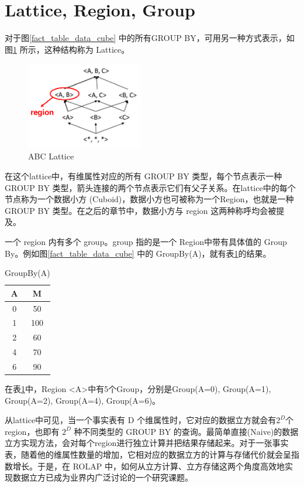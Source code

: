 \section{Lattice, Region, Group}

对于图\ref{fact_table_data_cube} 中的所有GROUP BY，可用另一种方式表示，如图\ref{abc_lattice} 所示，这种结构称为 Lattice。

\begin{figure}[!htb]
\centering\includegraphics[width=2in]{picture/ch_preliminary/abc_lattice} 
\caption{ABC Lattice}\label{abc_lattice} 
\end{figure} 

在这个lattice中，有维属性对应的所有 GROUP BY 类型，每个节点表示一种 GROUP BY 类型，箭头连接的两个节点表示它们有父子关系。在lattice中的每个节点称为一个数据小方 (Cuboid)，数据小方也可被称为一个Region，也就是一种 GROUP BY 类型。在之后的章节中，数据小方与 region 这两种称呼均会被提及。

一个 region 内有多个 group。group 指的是一个
Region中带有具体值的 Group By。例如图\ref{fact_table_data_cube} 中的 GroupBy(A)，就有表\ref{groupby_a_table}的结果。

\begin{table}[hbtp]
\begin{center}
\begin{tabular}{|c|c|}
\hline 
A & M \\ 
\hline 
0 & 50 \\ 
\hline 
1 & 100 \\ 
\hline 
2 & 60 \\ 
\hline 
4 & 70 \\ 
\hline 
6 & 90 \\ 
\hline 
\end{tabular} 
\end{center}
\caption{GroupBy(A)}\label{groupby_a_table}
\end{table}

在表\ref{groupby_a_table}中，Region \textless A\textgreater 中有5个Group，分别是Group(A=0), Group(A=1), Group(A=2), Group(A=4), Group(A=6)。

从lattice中可见，当一个事实表有 D 个维属性时，它对应的数据立方就会有${2}^{D}$个region，也即有 ${2}^{D}$ 种不同类型的 GROUP BY 的查询。最简单直接(Naive)的数据立方实现方法，会对每个region进行独立计算并把结果存储起来。对于一张事实表，随着他的维属性数量的增加，它相对应的数据立方的计算与存储代价就会呈指数增长。于是，在 ROLAP 中，如何从立方计算、立方存储这两个角度高效地实现数据立方已成为业界内广泛讨论的一个研究课题。


